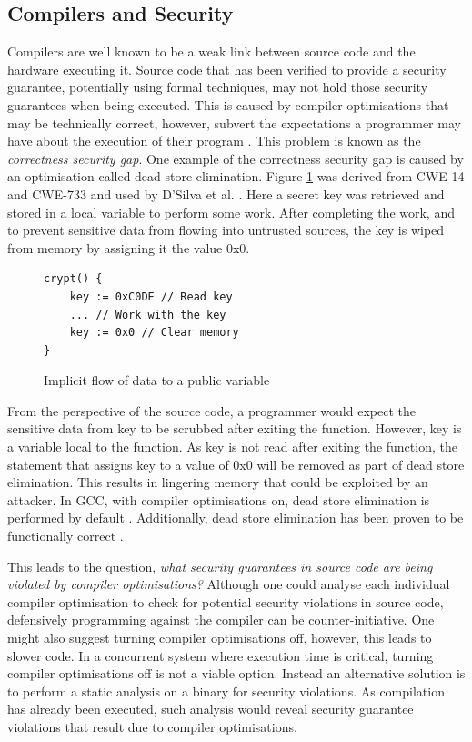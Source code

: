 \documentclass[twocolumn]{article}
\begin{document}
\subsection{Compilers and Security}
Compilers are well known to be a weak link between source code and the hardware executing it. Source code that has been verified to provide a security guarantee, potentially using formal techniques, may not hold those security guarantees when being executed. This is caused by compiler optimisations that may be technically correct, however, subvert the expectations a programmer may have about the execution of their program \cite{d2015correctness}. This problem is known as the \textit{correctness security gap}. One example of the correctness security gap is caused by an optimisation called dead store elimination. Figure \ref{fig:deadstore} was derived from CWE-14 \cite{cwe14} and CWE-733 \cite{cwe733} and used by D'Silva et al. \cite{d2015correctness}. Here a secret key was retrieved and stored in a local variable to perform some work. After completing the work, and to prevent sensitive data from flowing into untrusted sources, the key is wiped from memory by assigning it the value 0x0.

\begin{figure}
    \begin{lstlisting}
crypt() {
    key := 0xC0DE // Read key
    ... // Work with the key
    key := 0x0 // Clear memory
}
        \end{lstlisting}
    \caption{Implicit flow of data to a public variable}
    \label{fig:deadstore}
\end{figure}

From the perspective of the source code, a programmer would expect the sensitive data from key to be scrubbed after exiting the function. However, key is a variable local to the function. As key is not read after exiting the function, the statement that assigns key to a value of 0x0 will be removed as part of dead store elimination. This results in lingering memory that could be exploited by an attacker. In GCC, with compiler optimisations on, dead store elimination is performed by default \cite{gccoptimise}. Additionally, dead store elimination has been proven to be functionally correct \cite{benton2004simple}\cite{leroy2006formal}.


This leads to the question, \textit{what security guarantees in source code are being violated by compiler optimisations?} Although one could analyse each individual compiler optimisation to check for potential security violations in source code, defensively programming against the compiler can be counter-initiative. One might also suggest turning compiler optimisations off, however, this leads to slower code. In a concurrent system where execution time is critical, turning compiler optimisations off is not a viable option. Instead an alternative solution is to perform a static analysis on a binary for security violations. As compilation has already been executed, such analysis would reveal security guarantee violations that result due to compiler optimisations.
\end{document}
